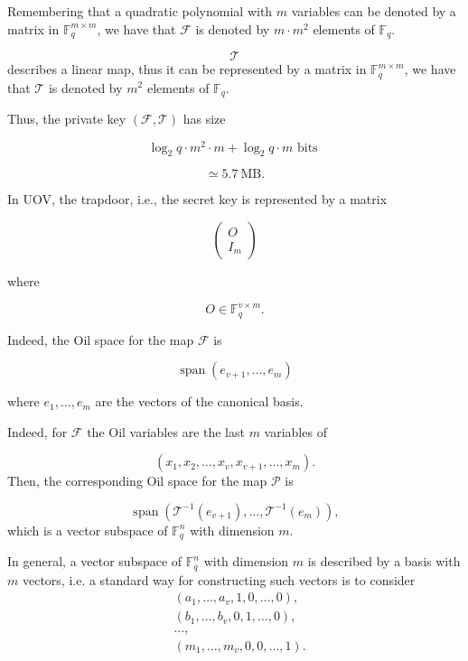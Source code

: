\noindent
Remembering that a quadratic polynomial with \(m\) variables can be denoted by a matrix in \(\mathbb{F}_q^{m \times m}\), we have that \(\mathcal{F}\) is denoted by \(m \cdot m^2\) elements of \(\mathbb{F}_q\).

\[
\mathcal{T}
\]
describes a linear map, thus it can be represented by a matrix in \(\mathbb{F}_q^{m \times m}\), we have that \(\mathcal{T}\) is denoted by \(m^2\) elements of \(\mathbb{F}_q\).

\noindent
Thus, the private key \((\mathcal{F}, \mathcal{T})\) has size

\[
\log_2 q \cdot m^2 \cdot m + \log_2 q \cdot m \text{ bits }
\]

\[
\simeq 5.7 \ \text{MB}.
\]

\vspace*{2em}

\noindent
In UOV, the trapdoor, i.e., the secret key is represented by a matrix

\[
\begin{pmatrix}
O \\
I_m
\end{pmatrix}
\]

\noindent
where

\[
O \in \mathbb{F}_q^{v \times m}.
\]

\noindent
Indeed, the Oil space for the map \(\mathcal{F}\) is

\[
\operatorname{span}(e_{v+1}, \ldots, e_m)
\]

\noindent
where \(e_1, \ldots, e_m\) are the vectors of the canonical basis.
\medskip

\noindent
Indeed, for \(\mathcal{F}\) the Oil variables are the last \(m\) variables of

\[
(x_1, x_2, \ldots, x_v, x_{v+1}, \ldots, x_m).
\]
\noindent
Then, the corresponding Oil space for the map \(\mathcal{P}\) is

\[
\operatorname{span}
\left(
\mathcal{T}^{-1}(e_{v+1}), \ldots, \mathcal{T}^{-1}(e_m)
\right),
\]
\noindent
which is a vector subspace of \(\mathbb{F}_q^n\) with dimension \(m\).
\medskip

\noindent
In general, a vector subspace of \(\mathbb{F}_q^n\) with dimension \(m\) is described by a basis with \(m\) vectors, i.e. a standard way for constructing such vectors is to consider
\begin{align*}
    &(a_1,\ldots,a_v,1,0,\ldots,0),\\
    &(b_1,\ldots,b_v,0,1,\ldots,0),\\
    &\ldots,\\
    &(m_1,\ldots,m_v,0,0,\ldots,1).
\end{align*}


